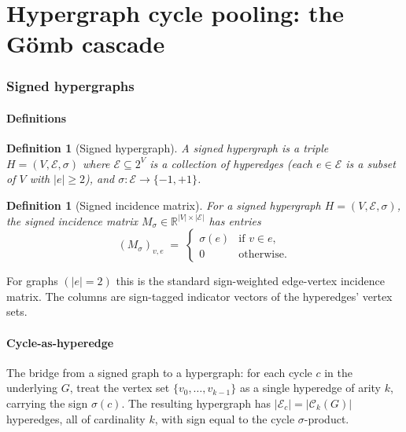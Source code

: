 \documentclass[11pt,a4paper]{article}
\newtheorem{definition}[theorem]{Definition}
\theoremstyle{remark}
\newcommand{\R}{\mathbb{R}}
\begin{document}
\bigskip
\part{Hypergraph cycle pooling: the G\"omb cascade}

\section{Signed hypergraphs}\label{sec:signed-hyper}

\subsection{Definitions}

\begin{definition}[Signed hypergraph]
A \emph{signed hypergraph} is a triple $H = (V, \mathcal{E}, \sigma)$
where $\mathcal{E} \subseteq 2^V$ is a collection of hyperedges
(each $e \in \mathcal{E}$ is a subset of $V$ with $|e| \geq 2$),
and $\sigma : \mathcal{E} \to \{-1, +1\}$.
\end{definition}

\begin{definition}[Signed incidence matrix]
For a signed hypergraph $H = (V, \mathcal{E}, \sigma)$, the
\emph{signed incidence matrix} $M_\sigma \in \R^{|V| \times |\mathcal{E}|}$
has entries
\[
  (M_\sigma)_{v, e} \;=\;
  \begin{cases}
    \sigma(e) & \text{if } v \in e, \\
    0 & \text{otherwise.}
  \end{cases}
\]
\end{definition}

For graphs $(|e| = 2)$ this is the standard sign-weighted
edge-vertex incidence matrix. The columns are sign-tagged
indicator vectors of the hyperedges' vertex sets.

\subsection{Cycle-as-hyperedge}

The bridge from a signed graph to a hypergraph: for each cycle
$c$ in the underlying $G$, treat the vertex set
$\{v_0, \dots, v_{k-1}\}$ as a single hyperedge of arity $k$,
carrying the sign $\sigma(c)$. The resulting hypergraph has
$|\mathcal{E}_c| = |\mathcal{C}_k(G)|$ hyperedges, all of cardinality
$k$, with sign equal to the cycle $\sigma$-product.
\end{document}
